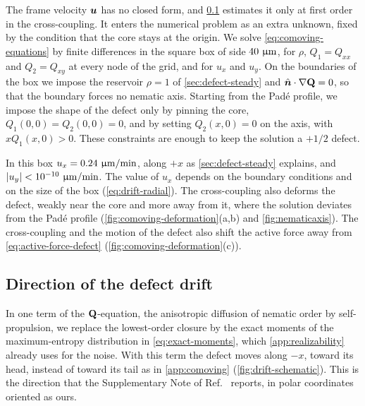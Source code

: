 \documentclass[aps,pre,reprint,superscriptaddress,longbibliography,nofootinbib
]{revtex4-2}
\begin{document}
The frame velocity $\boldsymbol{u}$ has no closed form, and
\cref{app:drift} estimates it only at first order in the
cross-coupling. It enters the numerical problem as an extra
unknown, fixed by the condition that the core stays at the
origin. We solve \cref{eq:comoving-equations} by finite
differences in the square box of side $40~\upmu\mathrm{m}$, for
$\rho$, $Q_1=Q_{xx}$ and $Q_2=Q_{xy}$ at every node of the
grid, and for $u_x$ and $u_y$. On the boundaries of the box
we impose the reservoir $\rho=1$ of
\cref{sec:defect-steady} and $\hat{\boldsymbol{n}}\cdot\nabla\mathbf{Q}=0$, so that
the boundary forces no nematic axis. Starting from the
Pad\'e profile, we impose the shape of the defect only by
pinning the core, $Q_1(0,0)=Q_2(0,0)=0$, and by setting
$Q_2(x,0)=0$ on the axis, with $x Q_1(x,0)>0$. These
constraints are enough to keep the solution a $+1/2$
defect.

In this box $u_x=0.24~\upmu\mathrm{m}/\text{min}$, along $+x$ as
\cref{sec:defect-steady} explains, and
$|u_y|<10^{-10}~\upmu\mathrm{m}/\text{min}$. The value of $u_x$
depends on the boundary conditions and on the size of the
box (\cref{eq:drift-radial}). The cross-coupling also
deforms the defect, weakly near the core and more away from
it, where the solution deviates from the Pad\'e profile
(\cref{fig:comoving-deformation}(a,b) and
\cref{fig:nematicaxis}). The cross-coupling and the motion
of the defect also shift the active force away from
\cref{eq:active-force-defect}
(\cref{fig:comoving-deformation}(c)).


\subsection{Direction of the defect drift}
\label{app:drift}
In one term of the $\mathbf{Q}$-equation, the anisotropic diffusion
of nematic order by self-propulsion, we replace the
lowest-order closure by the exact moments of the
maximum-entropy distribution in \cref{eq:exact-moments},
which \cref{app:realizability} already uses for the noise.
With this term the defect moves along $-x$, toward its
head, instead of toward its tail as in \cref{app:comoving}
(\cref{fig:drift-schematic}). This is the direction that
the Supplementary Note of Ref.~\cite{copenhagen2021}
reports, in polar coordinates oriented as ours.
\end{document}
